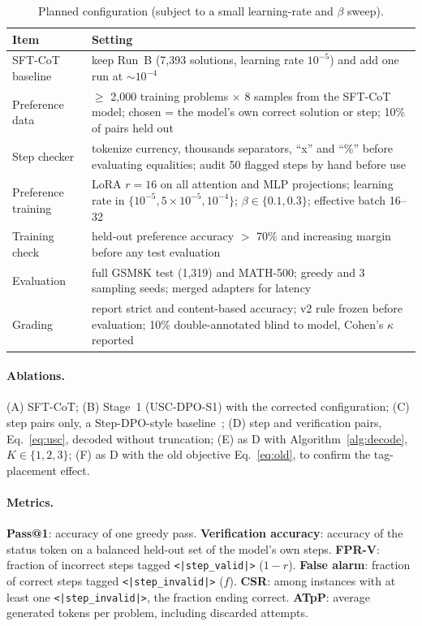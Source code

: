 \documentclass[11pt, a4paper]{article}
\newcommand{\valid}{\texttt{<|step\_\allowbreak valid|>}}
\newcommand{\invalid}{\texttt{<|step\_\allowbreak invalid|>}}
\newcommand{\soldpo}{USC-DPO-S1}
\begin{document}
\begin{table}[t]
\centering
\caption{Planned configuration (subject to a small learning-rate and $\beta$ sweep).}
\label{tab:plancfg}
\small
\begin{tabularx}{\textwidth}{lX}
\toprule
\textbf{Item} & \textbf{Setting} \\
\midrule
SFT-CoT baseline & keep Run~B (7{,}393 solutions, learning rate $10^{-5}$) and add one run at $\sim10^{-4}$ \\
Preference data & $\ge$ 2{,}000 training problems $\times$ 8 samples from the SFT-CoT model; chosen = the model's own correct solution or step; 10\% of pairs held out \\
Step checker & tokenize currency, thousands separators, ``x'' and ``\%'' before evaluating equalities; audit 50 flagged steps by hand before use \\
Preference training & LoRA $r=16$ on all attention and MLP projections; learning rate in $\{10^{-5},5\times10^{-5},10^{-4}\}$; $\beta\in\{0.1,0.3\}$; effective batch 16--32 \\
Training check & held-out preference accuracy $>$ 70\% and increasing margin before any test evaluation \\
Evaluation & full GSM8K test (1{,}319) and MATH-500; greedy and 3 sampling seeds; merged adapters for latency \\
Grading & report strict and content-based accuracy; v2 rule frozen before evaluation; 10\% double-annotated blind to model, Cohen's $\kappa$ reported \\
\bottomrule
\end{tabularx}
\end{table}

\paragraph{Ablations.} (A) SFT-CoT; (B) Stage~1 (\soldpo{}) with the corrected configuration; (C) step pairs only, a Step-DPO-style baseline~\cite{lai2024stepdpo}; (D) step and verification pairs, Eq.~\eqref{eq:usc}, decoded without truncation; (E) as D with Algorithm~\ref{alg:decode}, $K\in\{1,2,3\}$; (F) as D with the old objective Eq.~\eqref{eq:old}, to confirm the tag-placement effect.

\paragraph{Metrics.} \textbf{Pass@1}: accuracy of one greedy pass. \textbf{Verification accuracy}: accuracy of the status token on a balanced held-out set of the model's own steps. \textbf{FPR-V}: fraction of incorrect steps tagged \valid{} ($1-r$). \textbf{False alarm}: fraction of correct steps tagged \invalid{} ($f$). \textbf{CSR}: among instances with at least one \invalid{}, the fraction ending correct. \textbf{ATpP}: average generated tokens per problem, including discarded attempts.
\end{document}
